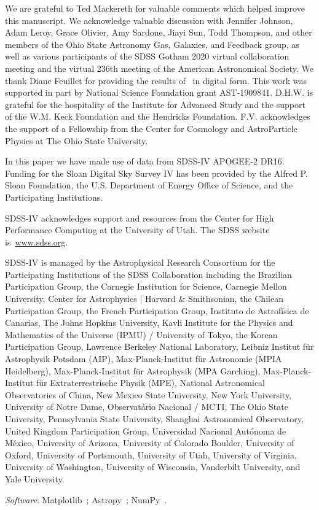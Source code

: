 \documentclass[draft2.tex]{subfiles}
\begin{document}
{\color{red} 
We are grateful to Ted Mackereth for valuable comments which helped improve 
this manuscript. 
} 
We acknowledge valuable discussion with Jennifer Johnson, Adam Leroy, Grace 
Olivier, Amy Sardone, Jiayi Sun, Todd Thompson, and other members of the Ohio 
State Astronomy Gas, Galaxies, and Feedback group, as well as various 
participants of the SDSS Gotham 2020 virtual collaboration meeting and the 
virtual 236th meeting of the American Astronomical Society. 
We thank Diane Feuillet for providing the results of~\citet{Feuillet2019} in 
digital form. 
This work was supported in part by National Science Foundation grant 
AST-1909841. 
D.H.W. is grateful for the hospitality of the Institute for Advanced Study and 
the support of the W.M. Keck Foundation and the Hendricks Foundation. 
F.V. acknowledges the support of a Fellowship from the Center for Cosmology and 
AstroParticle Physics at The Ohio State University. 
\par 
In this paper we have made use of data from SDSS-IV APOGEE-2 DR16. 
Funding for the Sloan Digital Sky 
Survey IV has been provided by the 
Alfred P. Sloan Foundation, the U.S. 
Department of Energy Office of 
Science, and the Participating 
Institutions. 
\par 
SDSS-IV acknowledges support and 
resources from the Center for High 
Performance Computing  at the 
University of Utah. The SDSS 
website is~\url{www.sdss.org}.
\par 
SDSS-IV is managed by the 
Astrophysical Research Consortium 
for the Participating Institutions 
of the SDSS Collaboration including 
the Brazilian Participation Group, 
the Carnegie Institution for Science, 
Carnegie Mellon University, Center for 
Astrophysics | Harvard \& 
Smithsonian, the Chilean Participation 
Group, the French Participation Group, 
Instituto de Astrof\'isica de 
Canarias, The Johns Hopkins 
University, Kavli Institute for the 
Physics and Mathematics of the 
Universe (IPMU) / University of 
Tokyo, the Korean Participation Group, 
Lawrence Berkeley National Laboratory, 
Leibniz Institut f\"ur Astrophysik 
Potsdam (AIP),  Max-Planck-Institut 
f\"ur Astronomie (MPIA Heidelberg), 
Max-Planck-Institut f\"ur 
Astrophysik (MPA Garching), 
Max-Planck-Institut f\"ur 
Extraterrestrische Physik (MPE), 
National Astronomical Observatories of 
China, New Mexico State University, 
New York University, University of 
Notre Dame, Observat\'ario 
Nacional / MCTI, The Ohio State 
University, Pennsylvania State 
University, Shanghai 
Astronomical Observatory, United 
Kingdom Participation Group, 
Universidad Nacional Aut\'onoma 
de M\'exico, University of Arizona, 
University of Colorado Boulder, 
University of Oxford, University of 
Portsmouth, University of Utah, 
University of Virginia, University 
of Washington, University of 
Wisconsin, Vanderbilt University, 
and Yale University.

\textit{Software}: Matplotlib~\citep{Matplotlib}; Astropy~\citep{Astropy2013, 
Astropy2018}; NumPy~\citep{NumPy}. 
\end{document}
